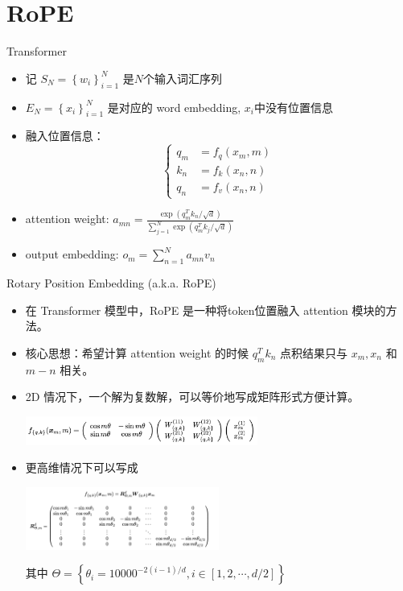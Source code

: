 \section{RoPE}

\begin{frame}{Transformer}
    \begin{itemize}
        \item 记 $S_N = \left\{ w_i \right\}_{i=1}^{N} $ 是$N$个输入词汇序列
        \item $E_N=\left\{ x_i \right\}_{i=1}^{N}$ 是对应的 word embedding, $x_i$中没有位置信息
        \item 融入位置信息：
        \[
            \begin{cases} q_m &= f_q(x_m, m) \\ k_n &= f_k(x_n, n) \\ q_n &= f_v(x_n, n) \end{cases}
        \]
        \item attention weight: $a_{mn} = \frac{\exp(q_m^{T}k_n / \sqrt d)}{ \sum_{j=1}^{N}\exp(q_m^{T}k_j / \sqrt d)}$
        \item output embedding: $o_m = \sum_{n=1}^{N} a_{mn} v_n$
    \end{itemize}
\end{frame}

\begin{frame}{Rotary Position Embedding (a.k.a. RoPE)}
    \begin{itemize}
        \item 在 Transformer 模型中，RoPE 是一种将token位置融入 attention 模块的方法。
        \item 核心思想：希望计算 attention weight 的时候 $q_m^{T} k_n$ 点积结果只与 $x_m, x_n$ 和 $m-n$ 相关。
        \item 2D 情况下，一个解为复数解，可以等价地写成矩阵形式方便计算。
        \begin{center}
            \includegraphics[width=0.6\textwidth]{assets/rope2.png}
        \end{center}
        \item 更高维情况下可以写成
        \begin{center}
            \includegraphics[width=0.5\textwidth]{assets/roped.png}
        \end{center}
        其中 $\Theta = \left\{ \theta_i = 10000^{-2(i-1)/d}, i \in [1, 2, \cdots, d / 2] \right\} $
    \end{itemize}
\end{frame}
